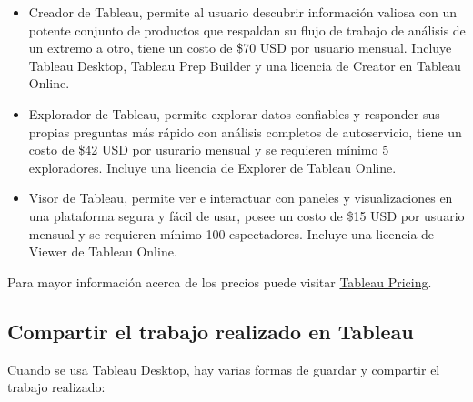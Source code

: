 \documentclass[
]{book}
\providecommand{\tightlist}{%
  \setlength{\itemsep}{0pt}\setlength{\parskip}{0pt}}
\begin{document}
\begin{itemize}
\begin{itemize}
    \begin{itemize}
    \tightlist
    \item
      Creador de Tableau, permite al usuario descubrir información valiosa con un potente conjunto de productos que respaldan su flujo de trabajo de análisis de un extremo a otro, tiene un costo de \$70 USD por usuario mensual. Incluye Tableau Desktop, Tableau Prep Builder y una licencia de Creator en Tableau Online.
    \item
      Explorador de Tableau, permite explorar datos confiables y responder sus propias preguntas más rápido con análisis completos de autoservicio, tiene un costo de \$42 USD por usurario mensual y se requieren mínimo 5 exploradores. Incluye una licencia de Explorer de Tableau Online.
    \item
      Visor de Tableau, permite ver e interactuar con paneles y visualizaciones en una plataforma segura y fácil de usar, posee un costo de \$15 USD por usuario mensual y se requieren mínimo 100 espectadores. Incluye una licencia de Viewer de Tableau Online.
    \end{itemize}
  \end{itemize}
\end{itemize}

Para mayor información acerca de los precios puede visitar \href{https://www.tableau.com/pricing/individual}{Tableau Pricing}.

\hypertarget{compartirtrabajo}{%
\subsection{Compartir el trabajo realizado en Tableau}\label{compartirtrabajo}}

Cuando se usa Tableau Desktop, hay varias formas de guardar y compartir el trabajo realizado:
\end{document}
